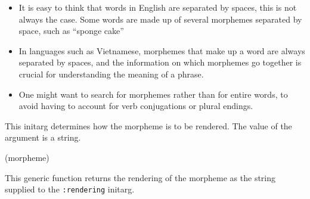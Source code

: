 \begin{itemize}
\item It is easy to think that words in English are separated by
  spaces, this is not always the case.  Some words are made up of
  several morphemes separated by space, such as ``sponge cake''
\item In languages such as Vietnamese, morphemes that make up a word
  are always separated by spaces, and the information on which
  morphemes go together is crucial for understanding the meaning of a
  phrase.
\item One might want to search for morphemes rather than for entire
  words, to avoid having to account for verb conjugations or plural
  endings.
\end{itemize}


This initarg determines how the morpheme is to be rendered.  The value
of the argument is a string.

 {(morpheme)}

This generic function returns the rendering of the morpheme as the
string supplied to the \texttt{:rendering} initarg.
